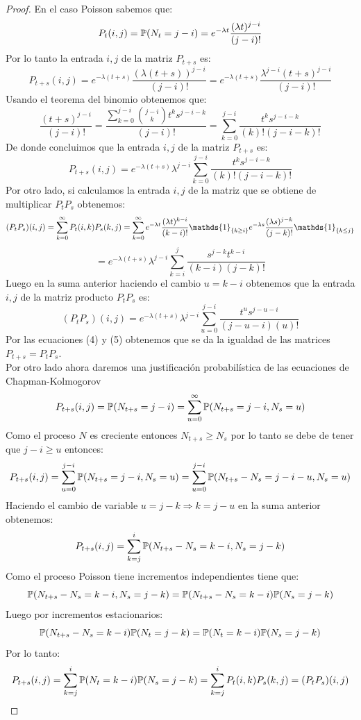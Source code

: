 \documentclass[a5paper,oneside]{amsart}
\theoremstyle{plain}
\theoremstyle{definition}
\begin{document}
\begin{proof}
En el caso Poisson sabemos que:
$$
P_t(i,j)= \mathbb{P} (N_t=j-i)=e^{-\lambda t}\frac{(\lambda t)^{j-i}}{(j-i)!} 
$$
Por lo tanto la entrada $i,j$ de la matriz $P_{t+s}$ es:
$$
P_{t+s}(i,j)=e^{-\lambda (t+s)}\frac{(\lambda (t+s))^{j-i}}{(j-i)!} =e^{-\lambda (t+s)}\frac{\lambda^{j-i}(t+s)^{j-i}}{(j-i)!} 
$$
Usando el teorema del binomio obtenemos que:
$$
\frac{(t+s)^{j-i}}{(j-i)!}=\frac{\sum_{k=0}^{j-i}{j-i \choose k}t^ks^{j-i-k}}{(j-i)!}=\sum_{k=0}^{j-i}\frac{t^ks^{j-i-k}}{(k)!(j-i-k)!}
$$
De donde concluimos que la entrada  $i,j$ de la matriz $P_{t+s}$ es:
\begin{equation}
P_{t+s}(i,j)=e^{-\lambda (t+s)}\lambda^{j-i}\sum_{k=0}^{j-i}\frac{t^ks^{j-i-k}}{(k)!(j-i-k)!}
\end{equation}
Por otro lado, si calculamos la entrada $i,j$ de la matriz que se obtiene de multiplicar $P_tP_s$ obtenemos:
$$
(P_tP_s)(i,j)=\sum_{k=0}^{\infty}P_t(i,k)P_s(k,j)=\sum_{k=0}^{\infty}e^{-\lambda t}\frac{(\lambda t)^{k-i}}{(k-i)!} \mathds{1}_{\set{k\geq i}}e^{-\lambda s}\frac{(\lambda s)^{j-k}}{(j-k)!} \mathds{1}_{\set{k\leq j}}
$$
$$
=e^{-\lambda (t+s)}\lambda^{j-i}\sum_{k=i}^{j}\frac{s^{j-k}t^{k-i}}{(k-i)(j-k)!} 
$$
Luego en la suma anterior haciendo el cambio $u=k-i$ obtenemos que la entrada $i,j$ de la matriz producto $P_tP_s$ es:
\begin{equation}
(P_tP_s)(i,j)=e^{-\lambda (t+s)}\lambda^{j-i}\sum_{u=0}^{j-i}\frac{t^{u}s^{j-u-i}}{(j-u-i)(u)!} 
\end{equation}
Por las ecuaciones (4) y (5) obtenemos que se da la igualdad de las matrices $P_{t+s}=P_tP_s$.\\
Por otro lado ahora daremos una justificaci\'on probabil\'istica de las ecuaciones de  Chapman-Kolmogorov
$$
P_{t+s}(i,j)= \mathbb{P} (N_{t+s}=j-i)=\sum_{u=0}^{\infty} \mathbb{P} (N_{t+s}=j-i,N_s=u)
$$
Como el proceso $N$ es creciente entonces $N_{t+s}\geq N_s$ por lo tanto  se debe de tener que  $j-i\geq u$   entonces:
$$
P_{t+s}(i,j)=\sum_{u=0}^{j-i} \mathbb{P} (N_{t+s}=j-i,N_s=u)=\sum_{u=0}^{j-i} \mathbb{P} (N_{t+s}-N_s=j-i-u,N_s=u)
$$
Haciendo el cambio de variable $u=j-k \Rightarrow k=j-u$ en la suma anterior obtenemos:
$$
P_{t+s}(i,j)=\sum_{k=j}^{i} \mathbb{P} (N_{t+s}-N_s=k-i,N_s=j-k)
$$
Como el proceso Poisson tiene incrementos   independientes tiene que:
 $$
  \mathbb{P} (N_{t+s}-N_s=k-i,N_s=j-k)= \mathbb{P} (N_{t+s}-N_s=k-i) \mathbb{P} (N_s=j-k)
 $$
 Luego por incrementos estacionarios:
 $$
  \mathbb{P} (N_{t+s}-N_s=k-i) \mathbb{P} (N_t=j-k)= \mathbb{P} (N_{t}=k-i) \mathbb{P} (N_s=j-k)
 $$
Por lo tanto:
$$
P_{t+s}(i,j)=\sum_{k=j}^{i} \mathbb{P} (N_{t}=k-i) \mathbb{P} (N_s=j-k)=\sum_{k=j}^{i}P_t(i,k)P_s(k,j)=(P_tP_s)(i,j)
$$
\end{proof}
\end{document}
